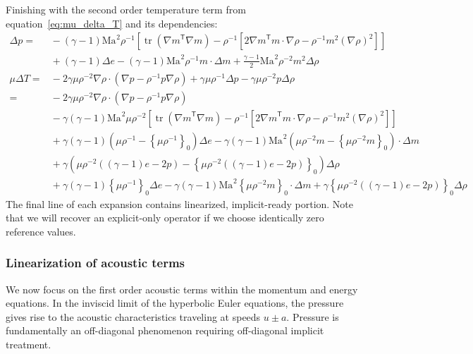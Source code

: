 \documentclass[letterpaper,11pt,nointlimits,reqno,draft]{amsart}
\newcommand{\trans}[1]{{#1}^{\ensuremath{\mathsf{T}}}}
\newcommand{\Mach}[1][]{\ensuremath{\mbox{Ma}_{#1}}}
\newcommand{\reference}[1]{\ensuremath{\left\{#1\right\}_{0}}}
\newcommand{\lessreference}[1]
  {\ensuremath{\left({#1}-\reference{#1}\right)}}
\DeclareMathOperator{\trace}{tr}
\begin{document}
Finishing with the second order temperature term from
equation~\eqref{eq:mu_delta_T} and its dependencies:
\begin{align}
\Delta{}p =
  &{}- \left(\gamma-1\right)\Mach^{2}\rho^{-1}\left[
             \trace\left(\trans{\nabla{}m}\nabla{}m\right)
           - \rho^{-1}\left[
               2\trans{\nabla{}m}m\cdot\nabla{}\rho
             - \rho^{-1} m^2 \left(\nabla\rho\right)^{2}
           \right]
       \right]
\\
  &{}+ \left(\gamma-1\right)\Delta{}e
     - \left(\gamma-1\right)\Mach^{2}\rho^{-1}m\cdot\Delta{}m
     + \frac{\gamma-1}{2}\Mach^{2}\rho^{-2}m^2 \Delta\rho
\\
\label{eq:linear_ready_delta_T}
\mu\Delta{}T =
  &{}- 2\gamma\mu\rho^{-2}\nabla\rho\cdot
       \left(\nabla{}p-\rho^{-1}p\nabla\rho\right)
     + \gamma\mu\rho^{-1}\Delta{}p
     - \gamma\mu\rho^{-2}p\Delta\rho
\\
=
  &{}- 2\gamma\mu\rho^{-2}\nabla{}\rho\cdot
       \left(\nabla{}p-\rho^{-1}p\nabla\rho\right)
\\
  &{}- \gamma\left(\gamma-1\right)\Mach^{2}\mu\rho^{-2}\left[
             \trace\left(\trans{\nabla{}m}\nabla{}m\right)
           - \rho^{-1}\left[
               2\trans{\nabla{}m}m\cdot\nabla{}\rho
             - \rho^{-1} m^2 \left(\nabla\rho\right)^{2}
           \right]
       \right]
\\
  &{}+ \gamma\left(\gamma-1\right)\lessreference{\mu\rho^{-1}}\Delta{}e
     - \gamma\left(\gamma-1\right)\Mach^{2}
       \lessreference{\mu\rho^{-2}m}\cdot\Delta{}m
\\
  &{}+ \gamma\lessreference{
           \mu\rho^{-2}\left(\left(\gamma-1\right)e-2p\right)
       } \Delta\rho
\\
  &{}+ \gamma\left(\gamma-1\right)\reference{\mu\rho^{-1}}\Delta{}e
     - \gamma\left(\gamma-1\right)\Mach^{2}
       \reference{\mu\rho^{-2}m}\cdot\Delta{}m
     + \gamma\reference{
           \mu\rho^{-2}\left(\left(\gamma-1\right)e-2p\right)
       } \Delta\rho
\end{align}
The final line of each expansion contains linearized, implicit-ready portion.
Note that we will recover an explicit-only operator if we choose identically
zero reference values.

\subsubsection{Linearization of acoustic terms}

We now focus on the first order acoustic terms within the momentum and energy
equations.  In the inviscid limit of the hyperbolic Euler equations, the
pressure gives rise to the acoustic characteristics traveling at speeds
$u\pm{}a$.  Pressure is fundamentally an off-diagonal phenomenon requiring
off-diagonal implicit treatment.
\end{document}
